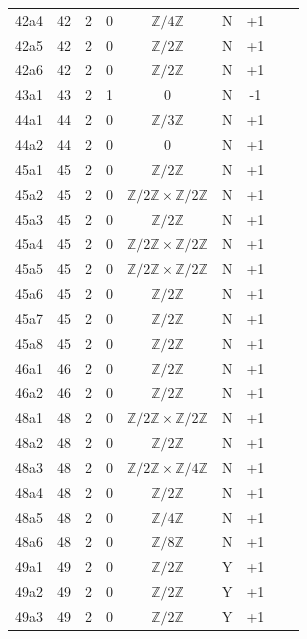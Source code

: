 \begin{table}[htbp]
\begin{tabular}{ccccccccc}
42a4 & 42 & 2 & 0 & $\mathbb{Z}/4\mathbb{Z}$ & N & +1 &  &  \\
42a5 & 42 & 2 & 0 & $\mathbb{Z}/2\mathbb{Z}$ & N & +1 &  &  \\
42a6 & 42 & 2 & 0 & $\mathbb{Z}/2\mathbb{Z}$ & N & +1 &  &  \\
43a1 & 43 & 2 & 1 & 0 & N & -1 &  &  \\
44a1 & 44 & 2 & 0 & $\mathbb{Z}/3\mathbb{Z}$ & N & +1 &  &  \\
44a2 & 44 & 2 & 0 & 0 & N & +1 &  &  \\
45a1 & 45 & 2 & 0 & $\mathbb{Z}/2\mathbb{Z}$ & N & +1 &  &  \\
45a2 & 45 & 2 & 0 & $\mathbb{Z}/2\mathbb{Z} \times \mathbb{Z}/2\mathbb{Z}$ & N & +1 &  &  \\
45a3 & 45 & 2 & 0 & $\mathbb{Z}/2\mathbb{Z}$ & N & +1 &  &  \\
45a4 & 45 & 2 & 0 & $\mathbb{Z}/2\mathbb{Z} \times \mathbb{Z}/2\mathbb{Z}$ & N & +1 &  &  \\
45a5 & 45 & 2 & 0 & $\mathbb{Z}/2\mathbb{Z} \times \mathbb{Z}/2\mathbb{Z}$ & N & +1 &  &  \\
45a6 & 45 & 2 & 0 & $\mathbb{Z}/2\mathbb{Z}$ & N & +1 &  &  \\
45a7 & 45 & 2 & 0 & $\mathbb{Z}/2\mathbb{Z}$ & N & +1 &  &  \\
45a8 & 45 & 2 & 0 & $\mathbb{Z}/2\mathbb{Z}$ & N & +1 &  &  \\
46a1 & 46 & 2 & 0 & $\mathbb{Z}/2\mathbb{Z}$ & N & +1 &  &  \\
46a2 & 46 & 2 & 0 & $\mathbb{Z}/2\mathbb{Z}$ & N & +1 &  &  \\
48a1 & 48 & 2 & 0 & $\mathbb{Z}/2\mathbb{Z} \times \mathbb{Z}/2\mathbb{Z}$ & N & +1 &  &  \\
48a2 & 48 & 2 & 0 & $\mathbb{Z}/2\mathbb{Z}$ & N & +1 &  &  \\
48a3 & 48 & 2 & 0 & $\mathbb{Z}/2\mathbb{Z} \times \mathbb{Z}/4\mathbb{Z}$ & N & +1 &  &  \\
48a4 & 48 & 2 & 0 & $\mathbb{Z}/2\mathbb{Z}$ & N & +1 &  &  \\
48a5 & 48 & 2 & 0 & $\mathbb{Z}/4\mathbb{Z}$ & N & +1 &  &  \\
48a6 & 48 & 2 & 0 & $\mathbb{Z}/8\mathbb{Z}$ & N & +1 &  &  \\
49a1 & 49 & 2 & 0 & $\mathbb{Z}/2\mathbb{Z}$ & Y & +1 &  &  \\
49a2 & 49 & 2 & 0 & $\mathbb{Z}/2\mathbb{Z}$ & Y & +1 &  &  \\
49a3 & 49 & 2 & 0 & $\mathbb{Z}/2\mathbb{Z}$ & Y & +1 &  &  \\

\end{tabular}
\end{table}
